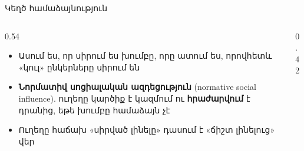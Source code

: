 \begin{frame}{Կեղծ համաձայնություն}
  \begin{columns}[c]
    \begin{column}{0.54\textwidth}
      \begin{itemize}
        \item Ասում ես, որ սիրում ես խումբը, որը ատում ես, որովհետև «կուլ» ընկերները սիրում են
        \item \textbf{Նորմատիվ սոցիալական ազդեցություն} (normative social influence). ուղեղը կարծիք է կազմում ու \textbf{հրաժարվում} է դրանից, եթե խումբը համաձայն չէ
        \item<2-> Ուղեղը հաճախ «սիրված լինելը» դասում է «ճիշտ լինելուց» վեր
      \end{itemize}
    \end{column}
    \begin{column}{0.42\textwidth}
    \end{column}
  \end{columns}
\end{frame}

